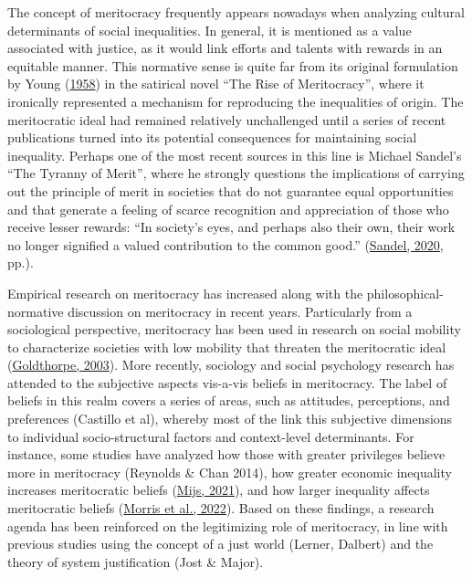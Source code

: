 \documentclass[
  letterpaper,
  DIV=11,
  numbers=noendperiod]{scrartcl}
\begin{document}
The concept of meritocracy frequently appears nowadays when analyzing
cultural determinants of social inequalities. In general, it is
mentioned as a value associated with justice, as it would link efforts
and talents with rewards in an equitable manner. This normative sense is
quite far from its original formulation by Young
(\protect\hyperlink{ref-young_rise_1958}{1958}) in the satirical novel
``The Rise of Meritocracy'', where it ironically represented a mechanism
for reproducing the inequalities of origin. The meritocratic ideal had
remained relatively unchallenged until a series of recent publications
turned into its potential consequences for maintaining social
inequality. Perhaps one of the most recent sources in this line is
Michael Sandel's ``The Tyranny of Merit'', where he strongly questions
the implications of carrying out the principle of merit in societies
that do not guarantee equal opportunities and that generate a feeling of
scarce recognition and appreciation of those who receive lesser rewards:
``In society's eyes, and perhaps also their own, their work no longer
signified a valued contribution to the common good.''
(\protect\hyperlink{ref-sandel_tyranny_2020}{Sandel, 2020}, pp.).

Empirical research on meritocracy has increased along with the
philosophical-normative discussion on meritocracy in recent years.
Particularly from a sociological perspective, meritocracy has been used
in research on social mobility to characterize societies with low
mobility that threaten the meritocratic ideal
(\protect\hyperlink{ref-goldthorpe_myth_2003}{Goldthorpe, 2003}). More
recently, sociology and social psychology research has attended to the
subjective aspects vis-a-vis beliefs in meritocracy. The label of
beliefs in this realm covers a series of areas, such as attitudes,
perceptions, and preferences (Castillo et al), whereby most of the link
this subjective dimensions to individual socio-structural factors and
context-level determinants. For instance, some studies have analyzed how
those with greater privileges believe more in meritocracy (Reynolds \&
Chan 2014), how greater economic inequality increases meritocratic
beliefs (\protect\hyperlink{ref-mijs_paradox_2021}{Mijs, 2021}), and how
larger inequality affects meritocratic beliefs
(\protect\hyperlink{ref-morris_representing_2022}{Morris et al., 2022}).
Based on these findings, a research agenda has been reinforced on the
legitimizing role of meritocracy, in line with previous studies using
the concept of a just world (Lerner, Dalbert) and the theory of system
justification (Jost \& Major).
\end{document}
